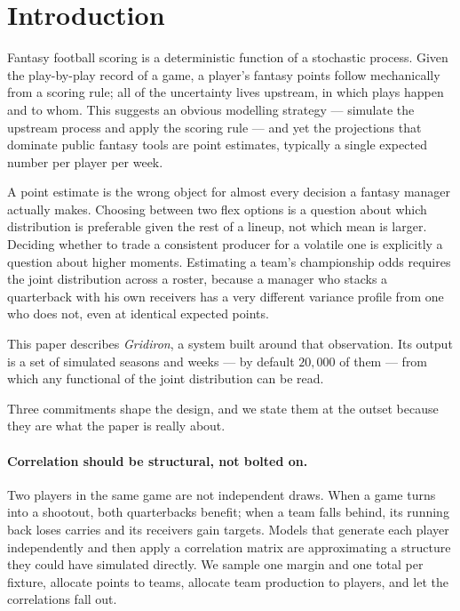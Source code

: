 \documentclass[11pt,a4paper]{article}
\begin{document}
\section{Introduction}

Fantasy football scoring is a deterministic function of a stochastic process.
Given the play-by-play record of a game, a player's fantasy points follow
mechanically from a scoring rule; all of the uncertainty lives upstream, in
which plays happen and to whom. This suggests an obvious modelling strategy ---
simulate the upstream process and apply the scoring rule --- and yet the
projections that dominate public fantasy tools are point estimates, typically a
single expected number per player per week.

A point estimate is the wrong object for almost every decision a fantasy manager
actually makes. Choosing between two flex options is a question about which
distribution is preferable given the rest of a lineup, not which mean is larger.
Deciding whether to trade a consistent producer for a volatile one is explicitly
a question about higher moments. Estimating a team's championship odds requires
the joint distribution across a roster, because a manager who stacks a
quarterback with his own receivers has a very different variance profile from
one who does not, even at identical expected points.

This paper describes \emph{Gridiron}, a system built around that observation.
Its output is a set of simulated seasons and weeks --- by default $20{,}000$ of
them --- from which any functional of the joint distribution can be read.

Three commitments shape the design, and we state them at the outset because they
are what the paper is really about.

\paragraph{Correlation should be structural, not bolted on.}
Two players in the same game are not independent draws. When a game turns into a
shootout, both quarterbacks benefit; when a team falls behind, its running back
loses carries and its receivers gain targets. Models that generate each player
independently and then apply a correlation matrix are approximating a structure
they could have simulated directly. We sample one margin and one total per
fixture, allocate points to teams, allocate team production to players, and let
the correlations fall out.
\end{document}
